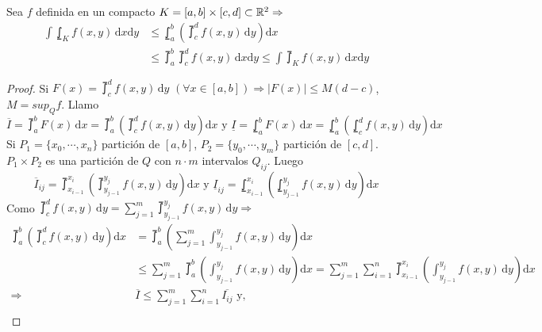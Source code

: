 \clearpage

\begin{theorem}
  Sea $f$ definida en un compacto $K = [a, b] \times [c, d] \subset \mathbb{R}^2 \Rightarrow$
  \begin{align*}
    \int \lowint_K f(x, y) \, \mathrm{d}x \mathrm{d}y & \leq \lowint_a^b(\upint_c^d f(x, y)\, \mathrm{d}y)\mathrm{d}x                                                       \\
                                                      & \leq \upint_a^b \upint_c^d f(x, y) \, \mathrm{d}x \mathrm{d}y \leq \int \upint_K f(x, y) \, \mathrm{d}x \mathrm{d}y
  \end{align*}
  \begin{proof}
    Si $F(x) = \upint_c^d f(x, y) \, \mathrm{d}y$ $(\forall x \in [a, b]) \Rightarrow |F(x)| \leq M (d - c)$, $M = sup_Q f$. Llamo $
      \overline{I} = \upint_a^b F(x)\, \mathrm{d}x = \upint_a^b(\upint_c^d f(x, y)\, \mathrm{d}y) \mathrm{d}x \text{ y }
      \underline{I} = \lowint_a^b F(x)\, \mathrm{d}x = \lowint_a^b( \lowint_c^d f(x, y)\, \mathrm{d}y) \mathrm{d}x
    $ \\
    Si $P_1 = \{x_0, \cdots, x_n\}$ partición de $[a, b]$, $P_2 = \{ y_0, \cdots, y_m \}$ partición de $[c, d]$. $P_1 \times P_2$ es una partición de $Q$ con $n \cdot m$ intervalos $Q_{ij}$. Luego \begin{equation}
      \overline{I}_{ij} = \upint_{x_{i-1}}^{x_i}( \upint_{y_{j-1}}^{y_j}f(x, y)\,\mathrm{d}y)\mathrm{d}x \text{ y }
      \underline{I}_{ij} = \lowint_{x_{i-1}}^{x_i}( \lowint_{y_{j-1}}^{y_j}f(x, y)\,\mathrm{d}y)\mathrm{d}x
    \end{equation} Como $\upint_c^d f(x, y)\, \mathrm{d}y = \sum_{j = 1}^m \upint_{y_{j-1}}^{y_j} f(x, y)\, \mathrm{d}y \Rightarrow$ \begin{align*}
      \upint_a^b(\upint_c^d f(x, y)\, \mathrm{d}y)\mathrm{d}x & = \upint_a^b( \sum_{j = 1}^m \int_{y_{j-1}}^{y_j}f(x, y)\, \mathrm{d}y)\mathrm{d}x                                                                                                              \\
                                                              & \leq \sum_{j = 1}^m \upint_a^b(\int_{y_{j-1}}^{y_j}f(x, y)\, \mathrm{d}y)\mathrm{d}x = \sum_{j = 1}^m \sum_{i = 1}^n \upint_{x_{i-1}}^{x_i}(\int_{y_{j-1}}^{y_j}f(x,y)\,\mathrm{d}y)\mathrm{d}x \\
      \Rightarrow                                             & \overline{I} \leq \sum_{j = 1}^m \sum_{i = 1}^n \overline{I_{ij}} \text{ y,}                                                                                                                    \\

\end{align*}
\end{proof}
\end{theorem}
